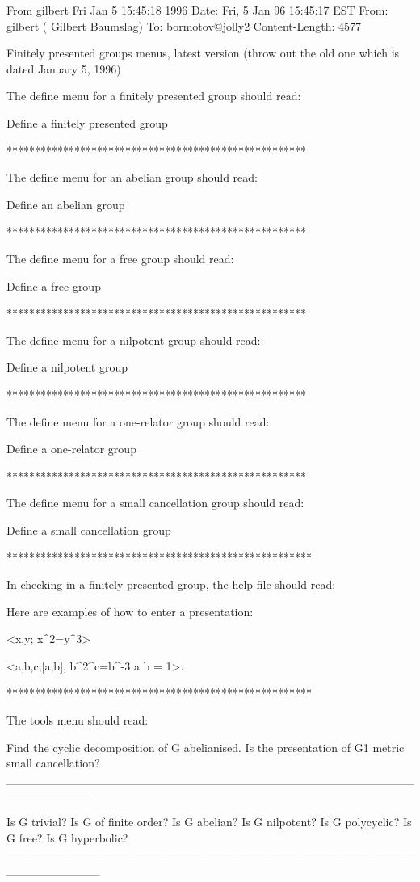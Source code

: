 From gilbert Fri Jan  5 15:45:18 1996
Date: Fri, 5 Jan 96 15:45:17 EST
From: gilbert ( Gilbert Baumslag)
To: bormotov@jolly2
Content-Length: 4577

Finitely presented groups menus, latest version
(throw out the old one which is dated January 5, 1996)

The  define menu for a finitely presented group
should read:

Define a finitely presented group

*****************************************************

The define menu for an abelian group should read:

Define an abelian group

*****************************************************

The define menu for a free group should read:

Define a free group

*****************************************************

The define menu for a nilpotent group should read:

Define a nilpotent group

*****************************************************

The define menu for a one-relator group should read:

Define a one-relator group

*****************************************************

The define menu for a small cancellation group should 
read:

Define a small cancellation group

******************************************************

In checking in a finitely presented group, the help
file should read:

Here are examples of how to enter a presentation:

<x,y; x^2=y^3>

<a,b,c;[a,b], b^2^c=b^-3 a b = 1>.

******************************************************

The tools menu should read:

Find the cyclic decomposition of G abelianised.
Is the presentation of G1 metric small cancellation?
__________________________________________________________

Is G trivial?
Is G of finite order?
Is G abelian?
Is G nilpotent?
Is G polycyclic?
Is G free?
Is G hyperbolic?
___________________________________________________________

